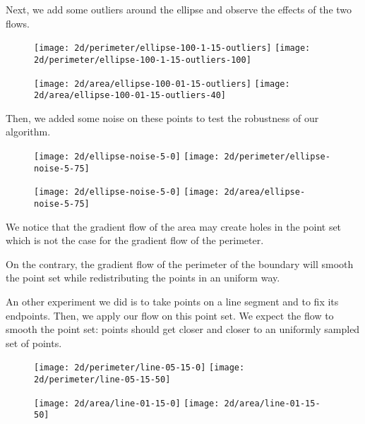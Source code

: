 Next, we add some outliers around the ellipse and observe the effects of the two
flows.

\begin{figure}[H]
    \centering

    \texttt{[image: 2d/perimeter/ellipse-100-1-15-outliers]}
    \texttt{[image: 2d/perimeter/ellipse-100-1-15-outliers-100]}
    \label{fig:ellipse_area_flow}

    \texttt{[image: 2d/area/ellipse-100-01-15-outliers]}
    \texttt{[image: 2d/area/ellipse-100-01-15-outliers-40]}
    \label{fig:ellipse_perimeter_flow}
\end{figure}

Then, we added some noise on these points to test the robustness of our
algorithm.

\begin{figure}[H]
    \centering

    \texttt{[image: 2d/ellipse-noise-5-0]}
    \texttt{[image: 2d/perimeter/ellipse-noise-5-75]}
    \label{fig:ellipse_area_flow}

    \texttt{[image: 2d/ellipse-noise-5-0]}
    \texttt{[image: 2d/area/ellipse-noise-5-75]}
    \label{fig:ellipse_perimeter_flow}
\end{figure}

We notice that the gradient flow of the area may create holes in the point set
which is not the case for the gradient flow of the perimeter.

On the contrary, the gradient flow of the perimeter of the boundary will smooth
the point set while redistributing the points in an uniform way.


An other experiment we did is to take points on a line segment and to fix its
endpoints. Then, we apply our flow on this point set. We expect the flow to
smooth the point set: points should get closer and closer to an uniformly
sampled set of points.

\begin{figure}[H]
    \centering

    \texttt{[image: 2d/perimeter/line-05-15-0]}
    \texttt{[image: 2d/perimeter/line-05-15-50]}
    \label{fig:line_fixed_perimeter}

    \texttt{[image: 2d/area/line-01-15-0]}
    \texttt{[image: 2d/area/line-01-15-50]}
    \label{fig:line_fixed_area}
\end{figure}



